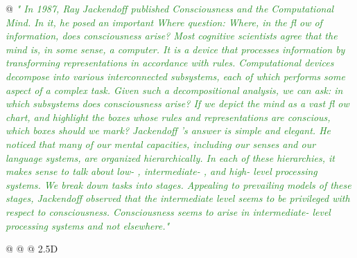 \documentclass[utf8]{article}
\newenvironment{ants}
			{
			 \begin{easylist}[itemize]
			}
			{
			\end{easylist}
			}
\newcommand{\rewrite}[1]{\textcolor{ForestGreen}{\textit{"#1"}}\newline}
\begin{document}
\begin{ants}
				@ \rewrite{
					In 1987, Ray Jackendoff published Consciousness and the Computational Mind. In it, he posed an important Where question: Where, in the fl ow of information, does consciousness arise? Most cognitive scientists agree that the mind is, in some sense, a computer. It is a device that processes information by transforming representations in accordance with rules. Computational devices decompose into various interconnected subsystems, each of which performs some aspect of a complex task. Given such a decompositional analysis, we can ask: in which subsystems does consciousness arise? If we depict the mind as a vast fl ow chart, and highlight the boxes whose rules and representations are conscious, which boxes should we mark? Jackendoff ’s answer is simple and elegant. He noticed that many of our mental capacities, including our senses and our language systems, are organized hierarchically. In each of these hierarchies, it makes sense to talk about low- , intermediate- , and high- level processing systems. We break down tasks into stages. Appealing to prevailing models of these stages, Jackendoff observed that the intermediate level seems to be privileged with respect to consciousness. Consciousness seems to arise in intermediate- level processing systems and not elsewhere.} \cite{prinz2007intermediate}
				
				@ \cite{jackendoff1987consciousness}
				@ \cite{prinz2007intermediate}
				@ 2.5D
			

\end{ants}
\end{document}
